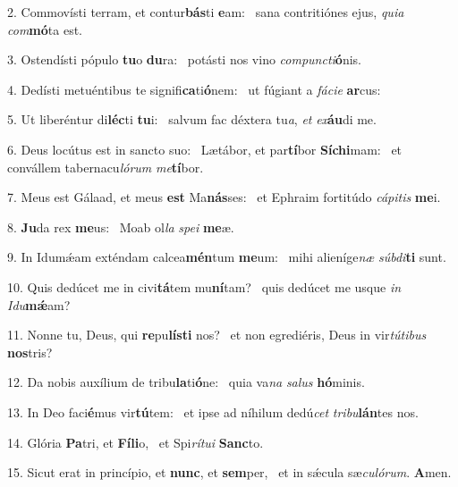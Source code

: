 2. Commovísti terram, et contur\textbf{bás}ti \textbf{e}am: \ast\  sana contritiónes ejus, \textit{qui}\textit{a} \textit{com}\textbf{mó}ta est.\

3. Ostendísti pópulo \textbf{tu}o \textbf{du}ra: \ast\  potásti nos vino \textit{com}\textit{punc}\textit{ti}\textbf{ó}nis.\

4. Dedísti metuéntibus te signifi\textbf{ca}ti\textbf{ó}nem: \ast\  ut fúgiant a \textit{fá}\textit{ci}\textit{e} \textbf{ar}cus:\

5. Ut liberéntur di\textbf{léc}ti \textbf{tu}i: \ast\  salvum fac déxtera tu\textit{a}, \textit{et} \textit{ex}\textbf{áu}di me.\

6. Deus locútus est in sancto suo: \dag\  Lætábor, et par\textbf{tí}bor \textbf{Sí}\textbf{chi}mam: \ast\  et convállem tabernacu\textit{ló}\textit{rum} \textit{me}\textbf{tí}bor.\

7. Meus est Gálaad, et meus \textbf{est} Ma\textbf{nás}ses: \ast\  et Ephraim fortitúdo \textit{cá}\textit{pi}\textit{tis} \textbf{me}i.\

8. \textbf{Ju}da rex \textbf{me}us: \ast\  Moab ol\textit{la} \textit{spe}\textit{i} \textbf{me}æ.\

9. In Idumǽam exténdam calcea\textbf{mén}tum \textbf{me}um: \ast\  mihi alieníge\textit{næ} \textit{súb}\textit{di}\textbf{ti} sunt.\

10. Quis dedúcet me in civi\textbf{tá}tem mu\textbf{ní}tam? \ast\  quis dedúcet me usque \textit{in} \textit{I}\textit{du}\textbf{mǽ}am?\

11. Nonne tu, Deus, qui \textbf{re}pu\textbf{lís}\textbf{ti} nos? \ast\  et non egrediéris, Deus in vir\textit{tú}\textit{ti}\textit{bus} \textbf{nos}tris?\

12. Da nobis auxílium de tribu\textbf{la}ti\textbf{ó}ne: \ast\  quia va\textit{na} \textit{sa}\textit{lus} \textbf{hó}minis.\

13. In Deo faci\textbf{é}mus vir\textbf{tú}tem: \ast\  et ipse ad níhilum dedú\textit{cet} \textit{tri}\textit{bu}\textbf{lán}tes nos.\

14. Glória \textbf{Pa}tri, et \textbf{Fí}\textbf{li}o, \ast\  et Spi\textit{rí}\textit{tu}\textit{i} \textbf{Sanc}to.\

15. Sicut erat in princípio, et \textbf{nunc}, et \textbf{sem}per, \ast\  et in sǽcula sæ\textit{cu}\textit{ló}\textit{rum}. \textbf{A}men.\

